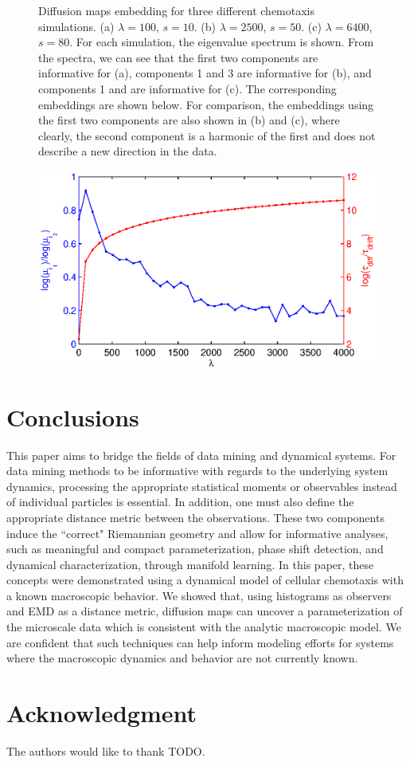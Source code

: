 \documentclass[preprint]{elsarticle}
\begin{document}
\begin{figure}
\begin{subfigure}[t]{0.35\textwidth}
\caption{}
\end{subfigure}
%
\caption{Diffusion maps embedding for three different chemotaxis simulations. (a) $\lambda = 100$, $s = 10$. (b) $\lambda = 2500$, $s = 50$. (c) $\lambda = 6400$, $s = 80$. For each simulation, the eigenvalue spectrum is shown. From the spectra, we can see that the first two components are informative for (a), components 1 and 3 are informative for (b), and components 1 and  are informative for (c). The corresponding embeddings are shown below. For comparison, the embeddings using the first two components are also shown in (b) and (c), where clearly, the second component is a harmonic of the first and does not describe a new direction in the data. }
%
\end{figure}

\begin{figure}[t]
%
\centering
\includegraphics[width=\textwidth]{chemotaxis_compare_timescales_evals}
%
\caption{}
%
\label{fig:chemotaxis_compare_timescales_evals}
%
\end{figure}

\section{Conclusions}

This paper aims to bridge the fields of data mining and dynamical systems. 
%
For data mining methods to be informative with regards to the underlying system dynamics, processing the appropriate statistical moments or observables instead of individual particles is essential. 
%
In addition, one must also define the appropriate distance metric between the observations.
%
These two components induce the ``correct" Riemannian geometry and allow for informative analyses, such as meaningful and compact parameterization, phase shift detection, and dynamical characterization, through manifold learning.
%
In this paper, these concepts were demonstrated using a dynamical model of cellular chemotaxis with a known macroscopic behavior.
%
We showed that, using histograms as observers and EMD as a distance metric, diffusion maps can uncover a parameterization of the microscale data which is consistent with the analytic macroscopic model.
%
We are confident that such techniques can help inform modeling efforts for systems where the macroscopic dynamics and behavior are not currently known. 


\section*{Acknowledgment}
The authors would like to thank TODO.



\end{document}
